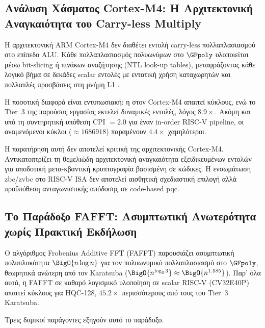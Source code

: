 \subsection{Ανάλυση Χάσματος Cortex-M4: Η Αρχιτεκτονική Αναγκαιότητα
 του Carry-less Multiply}
\label{ssec:cortex-m4-gap}

Η αρχιτεκτονική ARM Cortex-M4 δεν διαθέτει εντολή carry-less
πολλαπλασιασμού στο επίπεδο ALU. Κάθε πολλαπλασιασμός πολυωνύμων στο
$\GFpoly$ υλοποιείται μέσω bit-slicing ή πινάκων αναζήτησης (NTL
look-up tables), μεταφράζοντας κάθε λογικό βήμα σε δεκάδες scalar εντολές
με εντατική χρήση καταχωρητών και πολλαπλές προσβάσεις στη μνήμη L1
\cite{Jang2025-CortexM4-HQC}.

Η ποσοτική διαφορά είναι εντυπωσιακή: η \Decaps στον Cortex-M4 απαιτεί
 κύκλους, ενώ το Tier~3 της παρούσας εργασίας εκτελεί
 δυναμικές εντολές, λόγος $8.9\times$. Ακόμη και υπό τη
συντηρητική υπόθεση CPI $= 2.0$ για έναν in-order RISC-V pipeline, οι αναμενόμενοι κύκλοι
($\approx\num{1686918}$) παραμένουν $4.4\times$ χαμηλότεροι.

Η παρατήρηση αυτή δεν αποτελεί κριτική της αρχιτεκτονικής Cortex-M4.
Αντικατοπτρίζει τη θεμελιώδη αρχιτεκτονική αναγκαιότητα εξειδικευμένων
εντολών για αποδοτική μετα-κβαντική κρυπτογραφία βασισμένη σε κώδικες.
Η ενσωμάτωση \gls{zbc}/\gls{zvbc} στο RISC-V ISA δεν αποτελεί αισθητική σχεδιαστική
επιλογή αλλά προϋπόθεση ανταγωνιστικής απόδοσης σε code-based \gls{pqc}.

\subsection{Το Παράδοξο FAFFT: Ασυμπτωτική Ανωτερότητα χωρίς Πρακτική
 Εκδήλωση}
\label{ssec:fafft-paradox}

Ο αλγόριθμος Frobenius Additive FFT (FAFFT) παρουσιάζει ασυμπτωτική
πολυπλοκότητα $\BigO{n \log n}$ για τον πολυωνυμικό πολλαπλασιασμό στο
$\GFpoly$, θεωρητικά ανώτερη από τον Karatsuba ($\BigO{n^{\log_2 3}}
\approx \BigO{n^{1.585}}$). Παρ' όλα αυτά, η FAFFT σε καθαρό λογισμικό
υλοποίηση σε scalar RISC-V (CV32E40P)~\cite{ras-nist2025} απαιτεί
 κύκλους για \Decaps HQC-128, $45.2\times$ περισσότερους
από τους  \instret του Tier~3 Karatsuba.

Τρεις δομικοί παράγοντες εξηγούν αυτό το παράδοξο.

